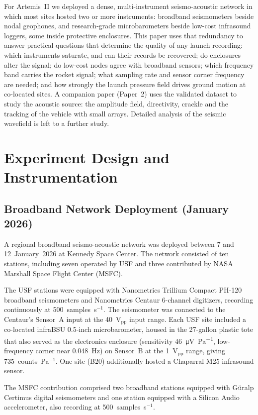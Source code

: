 \documentclass[]{seismica}
\newcommand{\papertwo}{Paper~2}
\begin{document}
For Artemis~II we deployed a dense, multi-instrument seismo-acoustic
network in which most sites hosted two or more instruments: broadband
seismometers beside nodal geophones, and research-grade microbarometers
beside low-cost infrasound loggers, some inside protective enclosures.
This paper uses that redundancy to answer practical questions that
determine the quality of any launch recording: which instruments
saturate, and can their records be recovered; do enclosures alter the
signal; do low-cost nodes agree with broadband sensors; which frequency
band carries the rocket signal; what sampling rate and sensor corner
frequency are needed; and how strongly the launch pressure field drives
ground motion at co-located sites. A companion paper (\papertwo) uses
the validated dataset to study the acoustic source: the amplitude field,
directivity, crackle and the tracking of the vehicle with small arrays.
Detailed analysis of the seismic wavefield is left to a further study.

\section{Experiment Design and Instrumentation}

\subsection{Broadband Network Deployment (January 2026)}

A regional broadband seismo-acoustic network was deployed between 7 and
12~January~2026 at Kennedy Space Center. The network consisted of ten
stations, including seven operated by USF and three contributed by NASA
Marshall Space Flight Center (MSFC).

The USF stations were equipped with Nanometrics Trillium Compact PH-120
broadband seismometers and Nanometrics Centaur 6-channel digitizers,
recording continuously at 500~samples~s$^{-1}$. The seismometer was
connected to the Centaur's Sensor~A input at the 40~V$_\text{pp}$ input
range. Each USF site included a co-located infraBSU 0.5-inch
microbarometer, housed in the 27-gallon plastic tote that also served as the
electronics enclosure (sensitivity \SI{46}{\micro\volt\per\pascal},
low-frequency corner near 0.048~Hz) on Sensor~B at the 1~V$_\text{pp}$
range, giving 735~counts~Pa$^{-1}$. One site (B20) additionally hosted a
Chaparral M25 infrasound sensor.

The MSFC contribution comprised two broadband stations equipped with
G\"{u}ralp Certimus digital seismometers and one station equipped with a
Silicon Audio accelerometer, also recording at 500~samples~s$^{-1}$.
\end{document}
